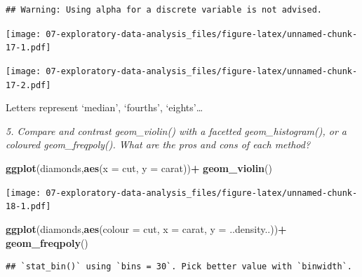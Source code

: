 \documentclass[]{book}
\newenvironment{Shaded}{\begin{snugshade}}{\end{snugshade}}
\newcommand{\DataTypeTok}[1]{\textcolor[rgb]{0.13,0.29,0.53}{#1}}
\newcommand{\KeywordTok}[1]{\textcolor[rgb]{0.13,0.29,0.53}{\textbf{#1}}}
\newcommand{\NormalTok}[1]{#1}
\newcommand{\OperatorTok}[1]{\textcolor[rgb]{0.81,0.36,0.00}{\textbf{#1}}}
\newcommand{\StringTok}[1]{\textcolor[rgb]{0.31,0.60,0.02}{#1}}
\theoremstyle{definition}
\theoremstyle{definition}
\theoremstyle{definition}
\theoremstyle{remark}
\begin{document}
\begin{verbatim}
## Warning: Using alpha for a discrete variable is not advised.
\end{verbatim}

\texttt{[image: 07-exploratory-data-analysis\_files/figure-latex/unnamed-chunk-17-1.pdf]}

\begin{Shaded}
\end{Shaded}

\texttt{[image: 07-exploratory-data-analysis\_files/figure-latex/unnamed-chunk-17-2.pdf]}

Letters represent `median', `fourths', `eights'\ldots{}

\emph{5. Compare and contrast geom\_violin() with a facetted
geom\_histogram(), or a coloured geom\_freqpoly(). What are the pros and
cons of each method?}

\begin{Shaded}
\begin{Highlighting}[]
\KeywordTok{ggplot}\NormalTok{(diamonds,}\KeywordTok{aes}\NormalTok{(}\DataTypeTok{x =}\NormalTok{ cut, }\DataTypeTok{y =}\NormalTok{ carat))}\OperatorTok{+}
\StringTok{  }\KeywordTok{geom_violin}\NormalTok{()}
\end{Highlighting}
\end{Shaded}

\texttt{[image: 07-exploratory-data-analysis\_files/figure-latex/unnamed-chunk-18-1.pdf]}

\begin{Shaded}
\begin{Highlighting}[]
\KeywordTok{ggplot}\NormalTok{(diamonds,}\KeywordTok{aes}\NormalTok{(}\DataTypeTok{colour =}\NormalTok{ cut, }\DataTypeTok{x =}\NormalTok{ carat, }\DataTypeTok{y =}\NormalTok{ ..density..))}\OperatorTok{+}
\StringTok{  }\KeywordTok{geom_freqpoly}\NormalTok{()}
\end{Highlighting}
\end{Shaded}

\begin{verbatim}
## `stat_bin()` using `bins = 30`. Pick better value with `binwidth`.
\end{verbatim}
\end{document}
